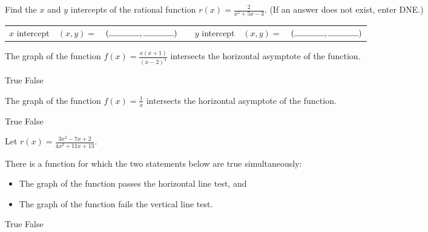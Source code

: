 \documentclass[11pt,answers]{exam}
\begin{document}
\begin{questions}


\addpoints

\question[2] Find the $x$ and $y$ intercepts of the rational function $\displaystyle r(x) = 
\frac{2}{x^2 + 5x - 3}$. (If an answer does not exist, enter DNE.)


{\tabulinesep=1.2mm
	\begin{tabu}{c  c c c c c c }
		
		$x$ intercept   & $(x,y)=$ & $(\hbox to 0.5in{\hrulefill},\hbox to 0.5in{\hrulefill})$    & &	
		$y$ intercept   & $(x,y)=$ & $(\hbox to 0.5in{\hrulefill},\hbox to 0.5in{\hrulefill})$    \\ 
	\end{tabu}}
	\vskip 0.2cm

\question[1] The graph of the function $\displaystyle f(x)=\frac{x(x+1)}{(x-2)^4}$ intersects the horizontal asymptote of the function.
\begin{oneparchoices}
	\choice True \choice False
	\end{oneparchoices} 
	
	\question[1] The graph of the function $\displaystyle f(x)=\frac{1}{x}$ intersects the horizontal asymptote of the function.
	\begin{oneparchoices}
		\choice True \choice False
	\end{oneparchoices} 
\question Let $\displaystyle r(x)=\frac{3x^2-7x+2}{4x^2+11x+13}$.

\question[1] There is a function for which the two statements below are true simultaneously:
\begin{itemize}
	\item The graph of the function passes the horizontal line test, and
	\item The graph of the function fails the vertical line test.
\end{itemize}

\begin{oneparchoices}
	\choice True \choice False
\end{oneparchoices} 


\end{questions}
\end{document}
